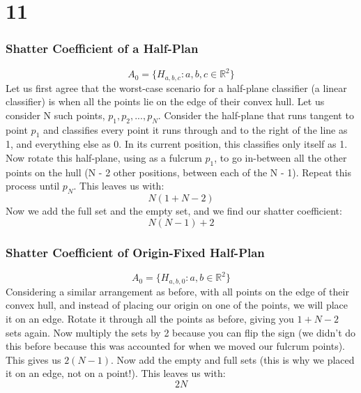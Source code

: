 \documentclass[a4paper,12pt]{article}
\begin{document}
\section*{11}

\subsubsection*{Shatter Coefficient of a Half-Plan}
$$
A_0 = \big\{ H_{a,b,c} : a,b,c \in \mathbb{R}^2 \big\}
$$
%
Let us first agree that the worst-case scenario for a half-plane classifier (a linear classifier) is when all the points lie on the edge of their convex hull. Let us consider N such points, $p_1, p_2,...,p_N$. Consider the half-plane that runs tangent to point $p_1$ and classifies every point it runs through and to the right of the line as 1, and everything else as 0. In its current position, this classifies only itself as 1. Now rotate this half-plane, using as a fulcrum $p_1$, to go in-between all the other points on the hull (N - 2 other positions, between each of the N - 1). Repeat this process until $p_N$. This leaves us with:
$$
N(1 + N - 2)
$$
%
Now we add the full set and the empty set, and we find our shatter coefficient:
$$
N(N - 1) + 2
$$
\subsubsection*{Shatter Coefficient of Origin-Fixed Half-Plan}
$$
A_0 = \big\{ H_{a,b,0} : a,b \in \mathbb{R}^2 \big\}
$$
%
Considering a similar arrangement as before, with all points on the edge of their convex hull, and instead of placing our origin on one of the points, we will place it on an edge. Rotate it through all the points as before, giving you $1 + N - 2$ sets again. Now multiply the sets by 2 because you can flip the sign (we didn't do this before because this was accounted for when we moved our fulcrum points). This gives us $2(N - 1)$. Now add the empty and full sets (this is why we placed it on an edge, not on a point!). This leaves us with:
$$
2N
$$
\end{document}
